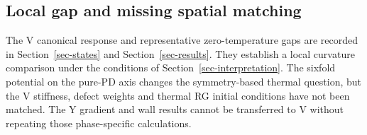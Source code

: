 \subsection{Local gap and missing spatial
matching}\label{local-gap-and-missing-spatial-matching}

The V canonical response and representative zero-temperature gaps are
recorded in Section~\ref{sec-states} and Section~\ref{sec-results}. They
establish a local curvature comparison under the conditions of
Section~\ref{sec-interpretation}. The sixfold potential on the pure-PD
axis changes the symmetry-based thermal question, but the V stiffness,
defect weights and thermal RG initial conditions have not been matched.
The Y gradient and wall results cannot be transferred to V without
repeating those phase-specific calculations.
